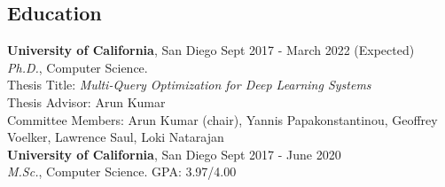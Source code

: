 \documentclass[margin]{res}
\begin{document}

\address{Phone: (+1) 812-558-6888\\ Email: snakanda@eng.ucsd.edu\\ Web: \href{https://scnakandala.github.io}{https://scnakandala.github.io}}
\address{3232 EBU3B CSE\\9500 Gilman Drive\\La Jolla, CA 92093}


\begin{resume}
\vspace{-1mm}

\vspace{-2mm}
\section{Education}
\textbf{University of California}, San Diego \hfill Sept 2017 - March 2022 (Expected)\\ 
{\sl Ph.D.}, Computer Science.\\
Thesis Title: \textit{Multi-Query Optimization for Deep Learning Systems}\\
\quad Thesis Advisor: Arun Kumar\\
\quad Committee Members: Arun Kumar (chair), Yannis Papakonstantinou, Geoffrey Voelker, Lawrence Saul, Loki Natarajan\\


\vspace{-5mm}
\textbf{University of California}, San Diego \hfill Sept 2017 - June 2020\\
{\sl M.Sc.}, Computer Science. GPA: 3.97/4.00\\


\end{resume}
\end{document}
